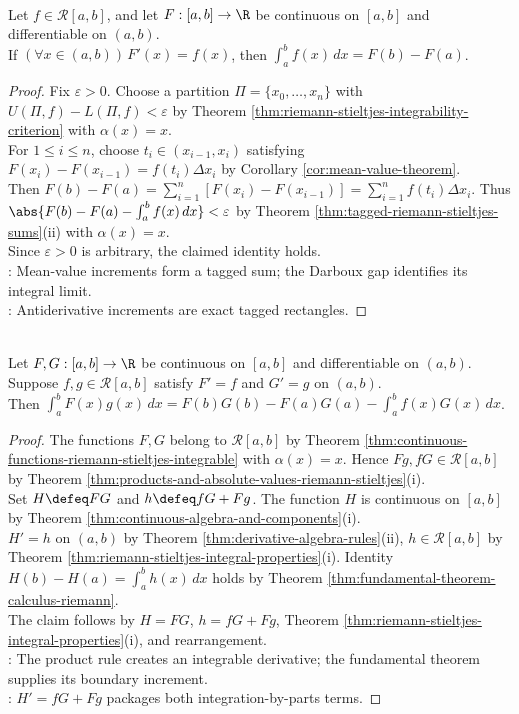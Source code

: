 \begin{theorem} \label{thm:fundamental-theorem-calculus-riemann} \\
Let $f\in\mathcal{R}[a,b]$, and let $F:[a,b]\to\R$ be continuous on $[a,b]$ and differentiable on $(a,b)$.\\
If $(\forall x\in(a,b))\,F'(x)=f(x)$, then $\int_a^b f(x)\,dx=F(b)-F(a)$.
\begin{proof}
Fix $\varepsilon>0$. Choose a partition $\Pi=\{x_0,\ldots,x_n\}$ with $U(\Pi,f)-L(\Pi,f)<\varepsilon$ by Theorem \ref{thm:riemann-stieltjes-integrability-criterion} with $\alpha(x)=x$.\\
For $1\leq i\leq n$, choose $t_i\in(x_{i-1},x_i)$ satisfying $F(x_i)-F(x_{i-1})=f(t_i)\Delta x_i$ by Corollary \ref{cor:mean-value-theorem}.\\
Then $F(b)-F(a)=\sum\limits_{i=1}^{n}[F(x_i)-F(x_{i-1})]=\sum\limits_{i=1}^{n}f(t_i)\Delta x_i$. Thus $\abs{F(b)-F(a)-\int_a^b f(x)\,dx}<\varepsilon$ by Theorem \ref{thm:tagged-riemann-stieltjes-sums}(ii) with $\alpha(x)=x$.\\
Since $\varepsilon>0$ is arbitrary, the claimed identity holds.\\
: Mean-value increments form a tagged sum; the Darboux gap identifies its integral limit.\\
: Antiderivative increments are exact tagged rectangles.
\end{proof}
\end{theorem}

\begin{theorem} \label{thm:riemann-integration-by-parts} \\
Let $F,G:[a,b]\to\R$ be continuous on $[a,b]$ and differentiable on $(a,b)$. Suppose $f,g\in\mathcal{R}[a,b]$ satisfy $F'=f$ and $G'=g$ on $(a,b)$.\\
Then $\int_a^b F(x)g(x)\,dx=F(b)G(b)-F(a)G(a)-\int_a^b f(x)G(x)\,dx$.
\begin{proof}
The functions $F,G$ belong to $\mathcal{R}[a,b]$ by Theorem \ref{thm:continuous-functions-riemann-stieltjes-integrable} with $\alpha(x)=x$. Hence $Fg,fG\in\mathcal{R}[a,b]$ by Theorem \ref{thm:products-and-absolute-values-riemann-stieltjes}(i).\\
Set $H\defeq FG$ and $h\defeq fG+Fg$. The function $H$ is continuous on $[a,b]$ by Theorem \ref{thm:continuous-algebra-and-components}(i).\\
$H'=h$ on $(a,b)$ by Theorem \ref{thm:derivative-algebra-rules}(ii), $h\in\mathcal{R}[a,b]$ by Theorem \ref{thm:riemann-stieltjes-integral-properties}(i). Identity $H(b)-H(a)=\int_a^b h(x)\,dx$ holds by Theorem \ref{thm:fundamental-theorem-calculus-riemann}.\\
The claim follows by $H=FG$, $h=fG+Fg$, Theorem \ref{thm:riemann-stieltjes-integral-properties}(i), and rearrangement.\\
: The product rule creates an integrable derivative; the fundamental theorem supplies its boundary increment.\\
: $H'=fG+Fg$ packages both integration-by-parts terms.
\end{proof}
\end{theorem}
